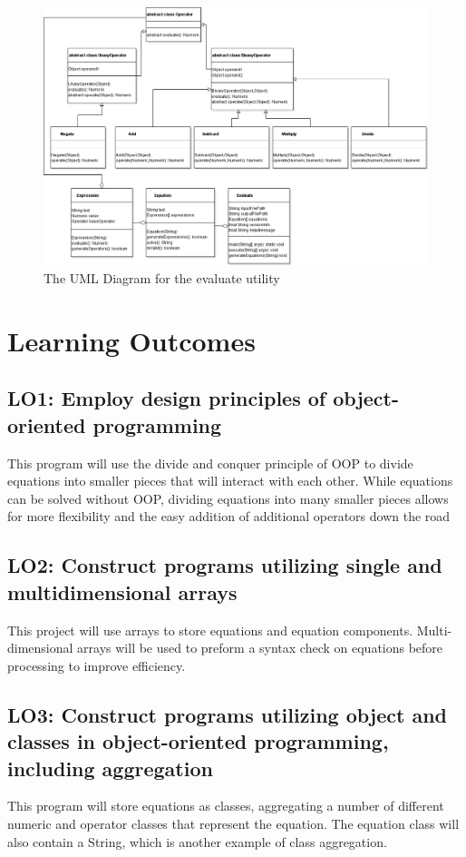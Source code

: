 \documentclass{article}
\begin{document}
\begin{figure}[h]
  	\includegraphics[width=1\textwidth]{Project1UML_1.png}
  	\caption{The UML Diagram for the evaluate utility}
  	\label{fig:Project 1 UML Diagram}
\end{figure}

\section{Learning Outcomes}
\subsection{LO1: Employ design principles of object-oriented programming}
This program will use the divide and conquer principle of OOP to divide equations into smaller pieces that will interact with each other. While equations can be solved without OOP, dividing equations into many smaller pieces allows for more flexibility and the easy addition of additional operators down the road
\subsection{LO2: Construct programs utilizing single and multidimensional arrays}
This project will use arrays to store equations and equation components. Multi-dimensional arrays will be used to preform a syntax check on equations before processing to improve efficiency.
\subsection{LO3: Construct programs utilizing object and classes in object-oriented programming, including aggregation}
This program will store equations as classes, aggregating a number of different numeric and operator classes that represent the equation. The equation class will also contain a String, which is another example of class aggregation.
\end{document}
